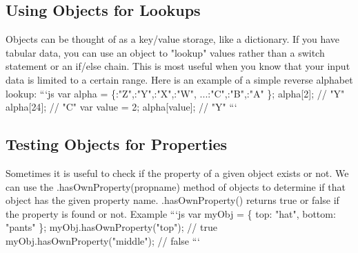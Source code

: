\documentclass{article}%
\begin{document}
\subsection{Using Objects for Lookups}%
\label{subsec:UsingObjectsforLookups}%
Objects can be thought of as a key/value storage, like a dictionary. If you have tabular data, you can use an object to "lookup" values rather than a switch statement or an if/else chain. This is most useful when you know that your input data is limited to a certain range.\newline%
Here is an example of a simple reverse alphabet lookup:\newline%
```js\newline%
var alpha = \{:"Z",:"Y",:"X",:"W",\newline%
  ...:"C",:"B",:"A"\newline%
\};\newline%
alpha{[}2{]}; // "Y"\newline%
alpha{[}24{]}; // "C"\newline%
var value = 2;\newline%
alpha{[}value{]}; // "Y"\newline%
```\newline%

%
\subsection{Testing Objects for Properties}%
\label{subsec:TestingObjectsforProperties}%
Sometimes it is useful to check if the property of a given object exists or not. We can use the .hasOwnProperty(propname) method of objects to determine if that object has the given property name. .hasOwnProperty() returns true or false if the property is found or not.\newline%
Example\newline%
```js\newline%
var myObj = \{\newline%
  top: "hat",\newline%
  bottom: "pants"\newline%
\};\newline%
myObj.hasOwnProperty("top");    // true\newline%
myObj.hasOwnProperty("middle"); // false\newline%
```\newline%
\end{document}
